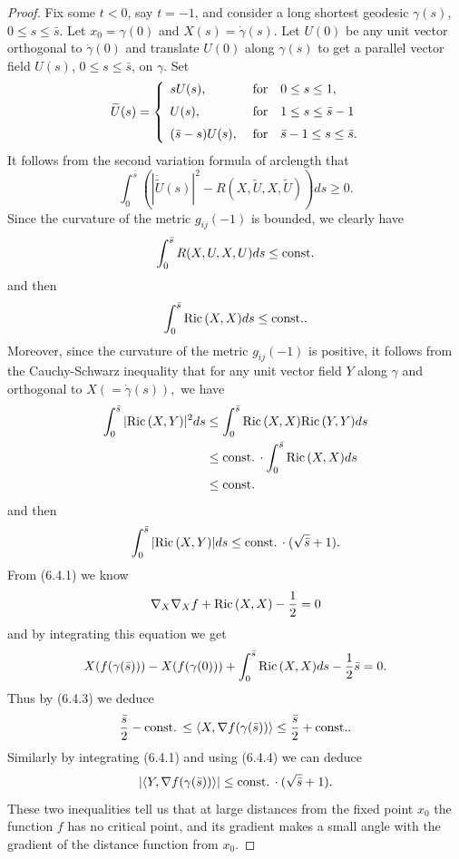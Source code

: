 \begin{proof}
Fix some $t<0$, say $t=-1$, and consider a long shortest geodesic
$\gamma(s)$, $0\le s\le\bar{s}.$ Let $x_0=\gamma(0)$ and
$X(s)=\dot{\gamma}(s).$ Let $U(0)$ be any unit vector orthogonal
to $\dot{\gamma}(0)$ and translate $U(0)$ along $\gamma(s)$ to get
a parallel vector field $U(s)$, $0\le s\le\bar{s}$, on $\gamma$.
Set
$$
\widetilde{U}(s)=\left\{\arraycolsep=1.5pt\begin{array}{lll}
&  sU(s),\quad &  \mbox{for}\quad 0\le s\le 1,\\[2mm]
&  U(s),\quad &  \mbox{for}\quad 1\le s\le\bar{s}-1\\[2mm]
&  (\bar{s}-s)U(s),\quad &  \mbox{for}\quad \bar{s}-1\le s\le
\bar{s}.\end{array}\right.
$$
It follows from the second variation formula of arclength that
$$
\int_0^{\bar{s}}(|\dot{\widetilde{U}}(s)|^2
-R(X,\widetilde{U},X,\widetilde{U}))ds\ge 0.
$$
Since the curvature of the metric $g_{ij}(-1)$ is bounded, we
clearly have
$$
\int_0^{\bar{s}}R(X,U,X,U)ds\le {\rm const.}
$$
and then \begin{equation}
\int_0^{\bar{s}}\Ric(X,X)ds\le {\rm const.}. %
\end{equation} Moreover, since the curvature of the metric $g_{ij}(-1)$ is
positive, it follows from the Cauchy-Schwarz inequality that for
any unit vector field $Y$ along $\gamma$ and orthogonal to
$X(=\dot{\gamma}(s)),$ we have
\begin{align*}
\int_0^{\bar{s}}|{\rm Ric}\,(X,Y)|^2ds
&  \le\int_0^{\bar{s}}{\rm Ric}\,(X,X){\rm Ric}\,(Y,Y)ds\\
&  \le {\rm const.}\,\cdot\int_0^{\bar{s}}{\rm Ric}\,(X,X)ds\\
&  \le {\rm const.}
\end{align*}
and then \begin{equation} \int_0^{\bar{s}}|\Ric(X,Y)|ds
\le {\rm const.}\,\cdot(\sqrt{\bar{s}}+1). %
\end{equation} {}From (6.4.1) we know
$$
\nabla_X\nabla_Xf+{\rm Ric}\,(X,X)-\frac{1}{2}=0
$$
and by integrating this equation we get
$$
X(f(\gamma(\bar{s})))-X(f(\gamma(0)))
+\int_0^{\bar{s}}{\rm Ric}\,(X,X)ds-\frac{1}{2}\bar{s}=0.
$$
Thus by (6.4.3) we deduce \begin{equation} \frac{\bar{s}}{2}-{\rm const.}\,\le
\langle X,\nabla f(\gamma(\bar{s}))\rangle
\le\frac{\bar{s}}{2}+{\rm const.}.  %
\end{equation} Similarly by integrating (6.4.1) and using (6.4.4) we can
deduce \begin{equation} |\langle Y,\nabla f(\gamma(\bar{s}))\rangle|
\le {\rm const.}\,\cdot (\sqrt{\bar{s}}+1). %
\end{equation} These two inequalities tell us that at large distances from
the fixed point $x_0$ the function $f$ has no critical point, and
its gradient makes a small angle with the gradient of the distance
function from $x_0$.


\end{proof}
